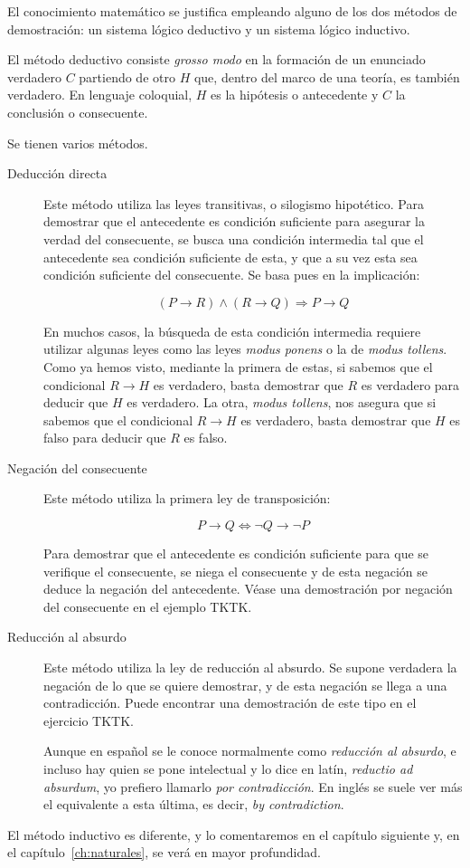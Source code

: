 



El conocimiento matemático se justifica empleando alguno de los dos métodos
de demostración: un sistema lógico deductivo y un sistema lógico inductivo.

El método deductivo consiste \emph{grosso modo} en la formación de un
enunciado verdadero $C$ partiendo de otro $H$ que, dentro del marco de una
teoría, es también verdadero. En lenguaje coloquial, $H$ es la hipótesis o
antecedente y $C$ la conclusión o consecuente.

Se tienen varios métodos.

\begin{description}
  \item[Deducción directa] Este método utiliza las leyes transitivas, o
    silogismo hipotético. Para demostrar que el antecedente es condición
    suficiente para asegurar la verdad del consecuente, se busca una
    condición intermedia tal que el antecedente sea condición suficiente de
    esta, y que a su vez esta sea condición suficiente del consecuente. Se
    basa pues en la implicación:

    $$ (P \to R) \land (R \to Q) \Longrightarrow P \to Q $$

    En muchos casos, la búsqueda de esta condición intermedia requiere
    utilizar algunas leyes como las leyes \emph{modus ponens} o la de
    \emph{modus tollens}. Como ya hemos visto, mediante  la primera de
    estas, si sabemos que el condicional $R \to H$ es verdadero, basta
    demostrar que $R$ es verdadero para deducir que $H$ es verdadero. La
    otra, \emph{modus tollens}, nos asegura que si sabemos que el
    condicional $R \to H$ es verdadero, basta demostrar que $H$ es falso
    para deducir que $R$ es falso.

  \item[Negación del consecuente] Este método utiliza la primera ley de
    transposición:

    $$ P \to Q \iff \neg Q \to \neg P $$

    Para demostrar que el antecedente es condición suficiente para que se
    verifique el consecuente, se niega el consecuente y de esta negación se
    deduce la negación del antecedente. Véase una demostración por negación
    del consecuente en el ejemplo TKTK.

  \item[Reducción al absurdo] Este método utiliza la ley de reducción al
    absurdo. Se supone verdadera la negación de lo que se quiere demostrar,
    y de esta negación se llega a una contradicción. Puede encontrar una
    demostración de este tipo en el ejercicio TKTK.

    Aunque en español se le conoce normalmente como \emph{reducción al
    absurdo}, e incluso hay quien se pone intelectual y lo dice en latín,
    \emph{reductio ad absurdum}, yo prefiero llamarlo \emph{por
    contradicción}. En inglés se suele ver más el equivalente a esta última,
    es decir, \emph{by contradiction}.
\end{description}

El método inductivo es diferente, y lo comentaremos en el capítulo siguiente
y, en el capítulo~\ref{ch:naturales}, se verá en mayor profundidad.






